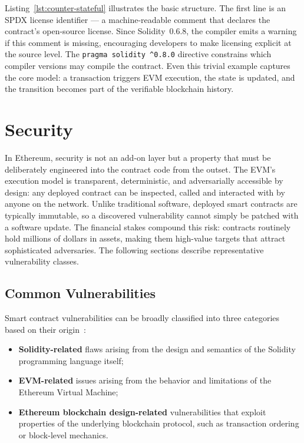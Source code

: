 Listing~\ref{lst:counter-stateful} illustrates the basic structure. The first line is an SPDX license identifier --- a machine-readable comment that declares the contract's open-source license. Since Solidity~0.6.8, the compiler emits a warning if this comment is missing, encouraging developers to make licensing explicit at the source level. The \texttt{pragma solidity \^{}0.8.0} directive constrains which compiler versions may compile the contract. Even this trivial example captures the core model: a transaction triggers EVM execution, the state is updated, and the transition becomes part of the verifiable blockchain history.

\section{Security}
\label{sec:security}

In Ethereum, security is not an add-on layer but a property that must be deliberately engineered into the contract code from the outset. The EVM's execution model is transparent, deterministic, and adversarially accessible by design: any deployed contract can be inspected, called and interacted with by anyone on the network. Unlike traditional software, deployed smart contracts are typically immutable, so a discovered vulnerability cannot simply be patched with a software update. The financial stakes compound this risk: contracts routinely hold millions of dollars in assets, making them high-value targets that attract sophisticated adversaries. The following sections describe representative vulnerability classes.

\subsection{Common Vulnerabilities}
\label{subsec:common-vulnerabilities}

Smart contract vulnerabilities can be broadly classified into three categories based on their origin~\cite{atzei2017survey}:

\begin{itemize}
    \item \textbf{Solidity-related} flaws arising from the design and semantics of the Solidity programming language itself;
    \item \textbf{EVM-related} issues arising from the behavior and limitations of the Ethereum Virtual Machine;
    \item \textbf{Ethereum blockchain design-related} vulnerabilities that exploit properties of the underlying blockchain protocol, such as transaction ordering or block-level mechanics.
\end{itemize}

